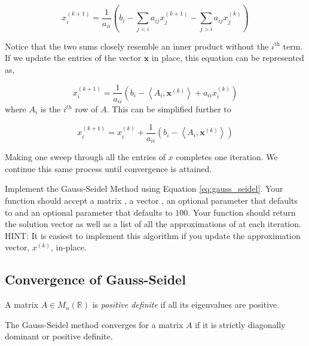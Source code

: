 \begin{equation} \label{eq:gauss_seidel_full}
x^{(k+1)}_i = \frac{1}{a_{ii}} \left (b_i - \sum_{j < i}a_{ij}x^{(k+1)}_j - \sum_{j > i}a_{ij}x^{(k)}_j \right )
\end{equation}

Notice that the two sums closely resemble an inner product without the
$i^{\text{th}}$ term. If we update the entries of the vector $\mathbf{x}$ in place,
this equation can be represented as,

$$
x^{(k+1)}_i = \frac{1}{a_{ii}} \left ( b_i - \left < A_i, \mathbf{x}^{(k)} \right > + a_{ii}x^{(k)}_i \right )
$$
where $A_i$ is the $i^{th}$ row of $A$. This can be simplified further to

\begin{equation} \label{eq:gauss_seidel}
x^{(k+1)}_i = x^{(k)}_i + \frac{1}{a_{ii}} \left ( b_i - \left < A_i, \mathbf{x}^{(k)}\right >\right)
\end{equation}

Making one sweep through all the entries of $x$ completes one iteration. We
continue this same process until convergence is attained.

\begin{problem} \label{prob:gauss_seidel}
Implement the Gauss-Seidel Method using Equation \ref{eq:gauss_seidel}. Your
function should accept a matrix , a vector , an optional parameter
 that defaults to  and an optional parameter  that
defaults to $100$. Your function should return the solution vector  as
well as a list of all the approximations of  at each iteration. HINT: It is
easiest to implement this algorithm if you update the approximation vector, $x^{(k)}$, in-place.
\end{problem}

\subsection*{Convergence of Gauss-Seidel}
\begin{definition}
    A matrix $A \in M_n(\mathbb{R})$ is \emph{positive definite} if all its
    eigenvalues are positive.
\end{definition}

\begin{theorem}
    The Gauss-Seidel method converges for a matrix $A$ if it is strictly
    diagonally dominant or positive definite.
\end{theorem}

